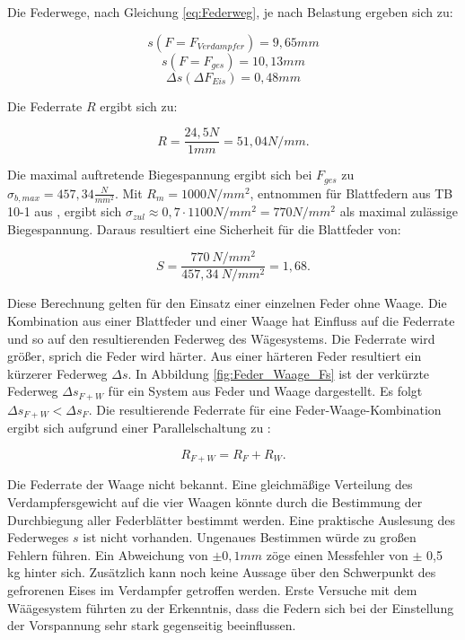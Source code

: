 Die Federwege, nach Gleichung \ref{eq:Federweg}, je nach Belastung ergeben sich zu:

\begin{equation*}
  s(F= F_{Verdampfer})=9,65 mm 
 \end{equation*}
 \begin{equation*}
 s(F= F_{ges})= 10,13 mm 
 \end{equation*}
\begin{equation*}
 \Delta s(\Delta F_{Eis}) = 0,48 mm
\end{equation*}

Die Federrate $R$ ergibt sich zu:

\begin{equation*}
R = \frac{24,5 N}{1 mm} = 51,04 N/mm.
\end{equation*}

Die maximal auftretende Biegespannung ergibt sich bei $F_{ges}$ zu  $\sigma_{b,max} = 457,34 \frac{N}{mm^2}.$ Mit $R_m =1000 N/mm^2$, entnommen für Blattfedern aus TB 10-1 aus \citep{Wittel2011}, ergibt sich  $\sigma_{zul}\approx 0,7 \cdot 1100 N/mm^2 = 770 N/mm^2  $ als maximal zulässige Biegespannung. Daraus resultiert eine Sicherheit für die Blattfeder von:

\begin{equation}
S= \frac{770~N/mm^2}{457,34~N/mm^2} = 1,68.
\end{equation}





Diese Berechnung gelten für den Einsatz einer einzelnen Feder ohne Waage. Die Kombination aus einer Blattfeder und einer Waage hat Einfluss auf die Federrate und so auf den resultierenden Federweg des Wägesystems. Die Federrate wird größer, sprich die Feder wird härter. Aus einer härteren Feder resultiert ein kürzerer Federweg $\Delta s$.  In Abbildung \ref{fig:Feder_Waage_Fs} ist der verkürzte Federweg $\Delta s_{F+W}$ für ein System aus Feder und Waage dargestellt. Es folgt $\Delta s_{F+W}< \Delta s_{F}$. Die resultierende Federrate für eine Feder-Waage-Kombination ergibt sich aufgrund einer Parallelschaltung zu :

\begin{equation}
R_{F+W}= R_F + R_W.
\end{equation}

Die Federrate der Waage nicht bekannt. Eine gleichmäßige Verteilung des Verdampfersgewicht auf die vier Waagen könnte durch die Bestimmung der Durchbiegung aller Federblätter bestimmt werden. Eine praktische Auslesung des Federweges $s$ ist nicht vorhanden. Ungenaues Bestimmen würde zu großen Fehlern führen. Ein Abweichung von $\pm 0,1 mm$ zöge einen Messfehler von $\pm$ 0,5 kg hinter sich.  Zusätzlich kann noch keine Aussage über den Schwerpunkt des gefrorenen Eises im Verdampfer getroffen werden.
Erste Versuche mit dem Wäägesystem führten zu der Erkenntnis, dass die Federn sich bei der Einstellung der Vorspannung sehr stark gegenseitig beeinflussen. 
 

